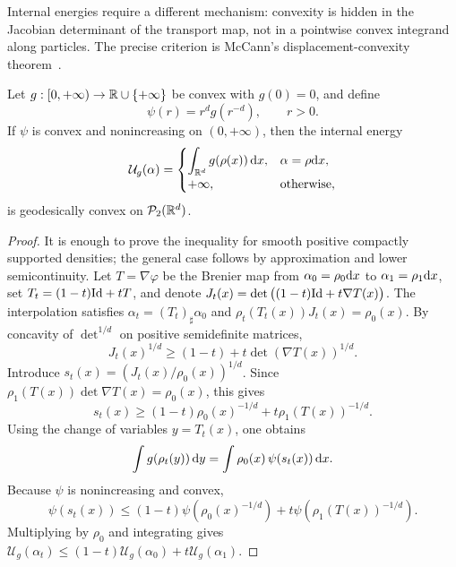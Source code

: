 Internal energies require a different mechanism: convexity is hidden in the Jacobian determinant of the transport map, not in a pointwise convex integrand along particles. The precise criterion is McCann's displacement-convexity theorem~\cite{mccann1997convexity}.

\begin{thm}\label{thm-mccann-internal-energy}
	Let \(g:[0,+\infty)\to\mathbb{R}\cup\{+\infty\}\) be convex with \(g(0)=0\), and define
	\[
		\psi(r)=r^d g(r^{-d}),\qquad r>0.
	\]
	If \(\psi\) is convex and nonincreasing on \((0,+\infty)\), then the internal energy
	\[
		\mathcal U_g(\alpha)=
		\begin{cases}
			\displaystyle \int_{\mathbb{R}^d} g(\rho(x))\,\mathrm{d} x, & \alpha=\rho\mathrm{d} x,\\
			+\infty, & \text{otherwise},
		\end{cases}
	\]
	is geodesically convex on \(\mathcal{P}_2(\mathbb{R}^d)\).
\end{thm}
\begin{proof}
	It is enough to prove the inequality for smooth positive compactly supported densities; the general case follows by approximation and lower semicontinuity. Let \(T=\nabla\varphi\) be the Brenier map from \(\alpha_0=\rho_0\mathrm{d} x\) to \(\alpha_1=\rho_1\mathrm{d} x\), set \(T_t=(1-t)\mathrm{Id}+tT\), and denote
	\(J_t(x)=\det\big((1-t)\mathrm{Id}+t\nabla T(x)\big)\).
	The interpolation satisfies \(\alpha_t=(T_t)_\sharp\alpha_0\) and
	\(\rho_t(T_t(x))J_t(x)=\rho_0(x)\).
	By concavity of \(\det^{1/d}\) on positive semidefinite matrices,
	\[
		J_t(x)^{1/d}\geq (1-t)+t\det(\nabla T(x))^{1/d}.
	\]
	Introduce \(s_t(x)=(J_t(x)/\rho_0(x))^{1/d}\). Since
	\(\rho_1(T(x))\det\nabla T(x)=\rho_0(x)\), this gives
	\[
		s_t(x)\geq (1-t)\rho_0(x)^{-1/d}+t\rho_1(T(x))^{-1/d}.
	\]
	Using the change of variables \(y=T_t(x)\), one obtains
	\[
		\int g(\rho_t(y))\,\mathrm{d} y
		=\int \rho_0(x)\,\psi(s_t(x))\,\mathrm{d} x.
	\]
	Because \(\psi\) is nonincreasing and convex,
	\[
		\psi(s_t(x))
		\leq (1-t)\psi(\rho_0(x)^{-1/d})+t\psi(\rho_1(T(x))^{-1/d}).
	\]
	Multiplying by \(\rho_0\) and integrating gives
	\(\mathcal U_g(\alpha_t)\leq(1-t)\mathcal U_g(\alpha_0)+t\mathcal U_g(\alpha_1)\).
\end{proof}

